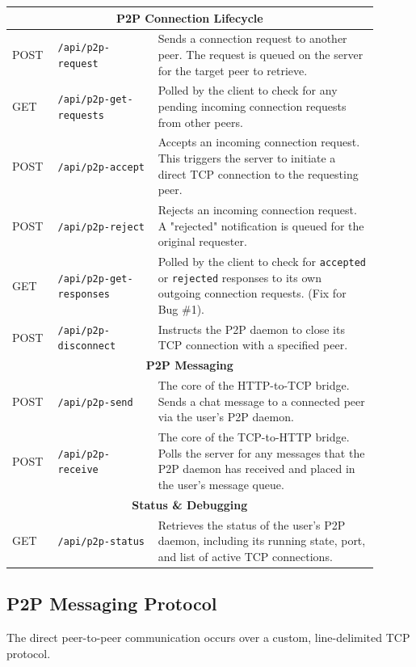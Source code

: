 \begin{longtable}{|p{0.1\linewidth}|p{0.25\linewidth}|p{0.55\linewidth}|}
    \multicolumn{3}{|c|}{\textbf{P2P Connection Lifecycle}} \\
    \hline
    POST & \texttt{/api/p2p-request} & Sends a connection request to another peer. The request is queued on the server for the target peer to retrieve. \\
    \hline
    GET & \texttt{/api/p2p-get-requests} & Polled by the client to check for any pending incoming connection requests from other peers. \\
    \hline
    POST & \texttt{/api/p2p-accept} & Accepts an incoming connection request. This triggers the server to initiate a direct TCP connection to the requesting peer. \\
    \hline
    POST & \texttt{/api/p2p-reject} & Rejects an incoming connection request. A "rejected" notification is queued for the original requester. \\
    \hline
    GET & \texttt{/api/p2p-get-responses} & Polled by the client to check for \texttt{accepted} or \texttt{rejected} responses to its own outgoing connection requests. (Fix for Bug \#1). \\
    \hline
    POST & \texttt{/api/p2p-disconnect} & Instructs the P2P daemon to close its TCP connection with a specified peer. \\
    \hline

    \multicolumn{3}{|c|}{\textbf{P2P Messaging}} \\
    \hline
    POST & \texttt{/api/p2p-send} & The core of the HTTP-to-TCP bridge. Sends a chat message to a connected peer via the user's P2P daemon. \\
    \hline
    POST & \texttt{/api/p2p-receive} & The core of the TCP-to-HTTP bridge. Polls the server for any messages that the P2P daemon has received and placed in the user's message queue. \\
    \hline

    \multicolumn{3}{|c|}{\textbf{Status \& Debugging}} \\
    \hline
    GET & \texttt{/api/p2p-status} & Retrieves the status of the user's P2P daemon, including its running state, port, and list of active TCP connections. \\
    \hline
\end{longtable}

\subsection{P2P Messaging Protocol}
\label{subsec:appendix_p2p_protocol}
The direct peer-to-peer communication occurs over a custom, line-delimited TCP protocol.

